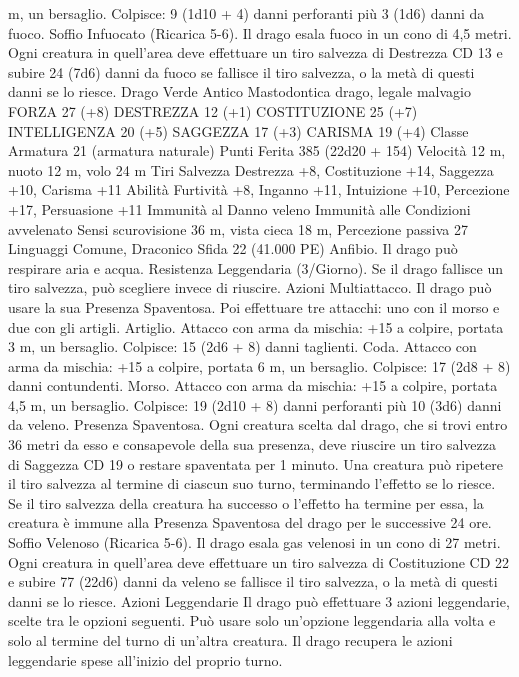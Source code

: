 \begin{multicols}{2}
m, un bersaglio.
Colpisce: 9 (1d10 + 4) danni perforanti più 3 (1d6) danni da
fuoco.
Soffio Infuocato (Ricarica 5-6). Il drago esala fuoco in un cono
di 4,5 metri. Ogni creatura in quell’area deve effettuare un tiro
salvezza di Destrezza CD 13 e subire 24 (7d6) danni da fuoco se
fallisce il tiro salvezza, o la metà di questi danni se lo riesce.
Drago Verde Antico
Mastodontica drago, legale malvagio
FORZA 27 (+8)
DESTREZZA 12 (+1)
COSTITUZIONE 25 (+7)
INTELLIGENZA 20 (+5)
SAGGEZZA 17 (+3)
CARISMA 19 (+4)
Classe Armatura 21 (armatura naturale)
Punti Ferita 385 (22d20 + 154)
Velocità 12 m, nuoto 12 m, volo 24 m
Tiri Salvezza Destrezza +8, Costituzione +14, Saggezza +10,
Carisma +11
Abilità Furtività +8, Inganno +11, Intuizione +10, Percezione
+17, Persuasione +11
Immunità al Danno veleno
Immunità alle Condizioni avvelenato
Sensi scurovisione 36 m, vista cieca 18 m, Percezione passiva 27
Linguaggi Comune, Draconico
Sfida 22 (41.000 PE)
Anfibio. Il drago può respirare aria e acqua.
Resistenza Leggendaria (3/Giorno). Se il drago fallisce un tiro
salvezza, può scegliere invece di riuscire.
Azioni
Multiattacco. Il drago può usare la sua Presenza Spaventosa. Poi
effettuare tre attacchi: uno con il morso e due con gli artigli.
Artiglio. Attacco con arma da mischia: +15 a colpire, portata 3
m, un bersaglio.
Colpisce: 15 (2d6 + 8) danni taglienti.
Coda. Attacco con arma da mischia: +15 a colpire, portata 6 m,
un bersaglio.
Colpisce: 17 (2d8 + 8) danni contundenti.
Morso. Attacco con arma da mischia: +15 a colpire, portata 4,5
m, un bersaglio.
Colpisce: 19 (2d10 + 8) danni perforanti più 10 (3d6) danni da veleno.
Presenza Spaventosa. Ogni creatura scelta dal drago, che si trovi
entro 36 metri da esso e consapevole della sua presenza, deve
riuscire un tiro salvezza di Saggezza CD 19 o restare spaventata per
1 minuto. Una creatura può ripetere il tiro salvezza al termine di
ciascun suo turno, terminando l’effetto se lo riesce. Se il tiro salvezza
della creatura ha successo o l’effetto ha termine per essa, la creatura è
immune alla Presenza Spaventosa del drago per le successive 24 ore.
Soffio Velenoso (Ricarica 5-6). Il drago esala gas velenosi in un
cono di 27 metri. Ogni creatura in quell’area deve effettuare un tiro
salvezza di Costituzione CD 22 e subire 77 (22d6) danni da veleno se
fallisce il tiro salvezza, o la metà di questi danni se lo riesce.
Azioni Leggendarie
Il drago può effettuare 3 azioni leggendarie, scelte tra le opzioni
seguenti. Può usare solo un’opzione leggendaria alla volta e solo
al termine del turno di un’altra creatura. Il drago recupera le
azioni leggendarie spese all’inizio del proprio turno.

\end{multicols}
